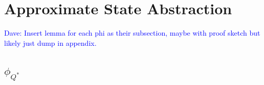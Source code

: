 \documentclass{article}
\newcommand\dnote[1]{\textcolor{blue}{Dave: #1}}
\begin{document}



%


\section{Approximate State Abstraction}





\dnote{Insert lemma for each phi as their subsection, maybe with proof sketch but likely just dump in appendix.}


\subsection{$\phi_{Q^*}$}
\end{document}
